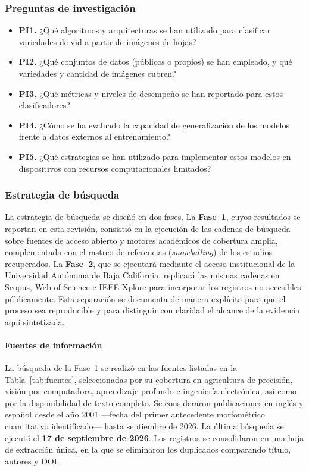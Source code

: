 \subsubsection{Preguntas de investigación}

\begin{itemize}
    \item \textbf{PI1.} ¿Qué algoritmos y arquitecturas se han utilizado para
    clasificar variedades de vid a partir de imágenes de hojas?
    \item \textbf{PI2.} ¿Qué conjuntos de datos (públicos o propios) se han
    empleado, y qué variedades y cantidad de imágenes cubren?
    \item \textbf{PI3.} ¿Qué métricas y niveles de desempeño se han reportado
    para estos clasificadores?
    \item \textbf{PI4.} ¿Cómo se ha evaluado la capacidad de generalización de
    los modelos frente a datos externos al entrenamiento?
    \item \textbf{PI5.} ¿Qué estrategias se han utilizado para implementar
    estos modelos en dispositivos con recursos computacionales limitados?
\end{itemize}

\subsubsection{Estrategia de búsqueda}

La estrategia de búsqueda se diseñó en dos fases. La \textbf{Fase~1}, cuyos
resultados se reportan en esta revisión, consistió en la ejecución de las
cadenas de búsqueda sobre fuentes de acceso abierto y motores académicos de
cobertura amplia, complementada con el rastreo de referencias
(\textit{snowballing}) de los estudios recuperados. La \textbf{Fase~2}, que
se ejecutará mediante el acceso institucional de la Universidad Autónoma de
Baja California, replicará las mismas cadenas en Scopus, Web of Science e
IEEE Xplore para incorporar los registros no accesibles públicamente. Esta
separación se documenta de manera explícita para que el proceso sea
reproducible y para distinguir con claridad el alcance de la evidencia aquí
sintetizada.

\paragraph{Fuentes de información}

La búsqueda de la Fase~1 se realizó en las fuentes listadas en la
Tabla~\ref{tab:fuentes}, seleccionadas por su cobertura en agricultura de
precisión, visión por computadora, aprendizaje profundo e ingeniería
electrónica, así como por la disponibilidad de texto completo. Se
consideraron publicaciones en inglés y español desde el año 2001 —fecha del
primer antecedente morfométrico cuantitativo identificado— hasta septiembre
de 2026. La última búsqueda se ejecutó el \textbf{17 de septiembre de 2026}.
Los registros se consolidaron en una hoja de extracción única, en la que se
eliminaron los duplicados comparando título, autores y DOI.


